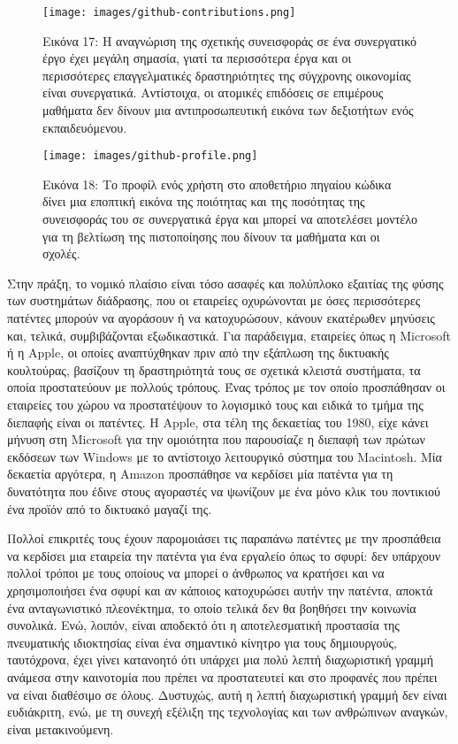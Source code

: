 \documentclass[
]{article}
\begin{document}
\leavevmode{}%
\begin{figure}
\hypertarget{fig:github-contributions}{%
\centering
\texttt{[image: images/github-contributions.png]}
\caption{Εικόνα 17: Η αναγνώριση της σχετικής συνεισφοράς σε ένα
συνεργατικό έργο έχει μεγάλη σημασία, γιατί τα περισσότερα έργα και οι
περισσότερες επαγγελματικές δραστηριότητες της σύγχρονης οικονομίας
είναι συνεργατικά. Αντίστοιχα, οι ατομικές επιδόσεις σε επιμέρους
μαθήματα δεν δίνουν μια αντιπροσωπευτική εικόνα των δεξιοτήτων ενός
εκπαιδευόμενου.}\label{fig:github-contributions}
}
\end{figure}

\leavevmode{}%
\begin{figure}
\hypertarget{fig:github-profile}{%
\centering
\texttt{[image: images/github-profile.png]}
\caption{Εικόνα 18: Το προφίλ ενός χρήστη στο αποθετήριο πηγαίου κώδικα
δίνει μια εποπτική εικόνα της ποιότητας και της ποσότητας της
συνεισφοράς του σε συνεργατικά έργα και μπορεί να αποτελέσει μοντέλο για
τη βελτίωση της πιστοποίησης που δίνουν τα μαθήματα και οι
σχολές.}\label{fig:github-profile}
}
\end{figure}

Στην πράξη, το νομικό πλαίσιο είναι τόσο ασαφές και πολύπλοκο εξαιτίας
της φύσης των συστημάτων διάδρασης, που οι εταιρείες οχυρώνονται με όσες
περισσότερες πατέντες μπορούν να αγοράσουν ή να κατοχυρώσουν, κάνουν
εκατέρωθεν μηνύσεις και, τελικά, συμβιβάζονται εξωδικαστικά. Για
παράδειγμα, εταιρείες όπως η Microsoft ή η Apple, οι οποίες αναπτύχθηκαν
πριν από την εξάπλωση της δικτυακής κουλτούρας, βασίζουν τη
δραστηριότητά τους σε σχετικά κλειστά συστήματα, τα οποία προστατεύουν
με πολλούς τρόπους. Ένας τρόπος με τον οποίο προσπάθησαν οι εταιρείες
του χώρου να προστατέψουν το λογισμικό τους και ειδικά το τμήμα της
διεπαφής είναι οι πατέντες. Η Apple, στα τέλη της δεκαετίας του 1980,
είχε κάνει μήνυση στη Microsoft για την ομοιότητα που παρουσίαζε η
διεπαφή των πρώτων εκδόσεων των Windows με το αντίστοιχο λειτουργικό
σύστημα του Macintosh. Μία δεκαετία αργότερα, η Amazon προσπάθησε να
κερδίσει μία πατέντα για τη δυνατότητα που έδινε στους αγοραστές να
ψωνίζουν με ένα μόνο κλικ του ποντικιού ένα προϊόν από το δικτυακό
μαγαζί της.

Πολλοί επικριτές τους έχουν παρομοιάσει τις παραπάνω πατέντες με την
προσπάθεια να κερδίσει μια εταιρεία την πατέντα για ένα εργαλείο όπως το
σφυρί: δεν υπάρχουν πολλοί τρόποι με τους οποίους να μπορεί ο άνθρωπος
να κρατήσει και να χρησιμοποιήσει ένα σφυρί και αν κάποιος κατοχυρώσει
αυτήν την πατέντα, αποκτά ένα ανταγωνιστικό πλεονέκτημα, το οποίο τελικά
δεν θα βοηθήσει την κοινωνία συνολικά. Ενώ, λοιπόν, είναι αποδεκτό ότι η
αποτελεσματική προστασία της πνευματικής ιδιοκτησίας είναι ένα σημαντικό
κίνητρο για τους δημιουργούς, ταυτόχρονα, έχει γίνει κατανοητό ότι
υπάρχει μια πολύ λεπτή διαχωριστική γραμμή ανάμεσα στην καινοτομία που
πρέπει να προστατευτεί και στο προφανές που πρέπει να είναι διαθέσιμο σε
όλους. Δυστυχώς, αυτή η λεπτή διαχωριστική γραμμή δεν είναι ευδιάκριτη,
ενώ, με τη συνεχή εξέλιξη της τεχνολογίας και των ανθρώπινων αναγκών,
είναι μετακινούμενη.
\end{document}
